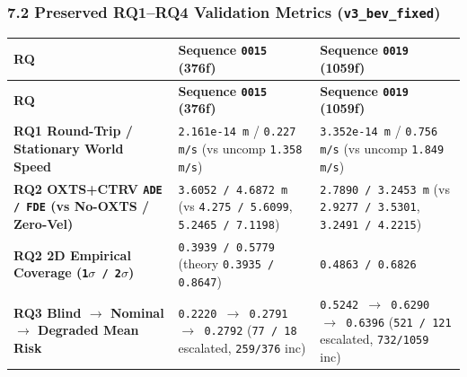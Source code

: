 \documentclass[10.5pt,a4paper]{article}
\begin{document}
\subsubsection{7.2 Preserved RQ1--RQ4 Validation Metrics (\texttt{v3\_\allowbreak{}bev\_\allowbreak{}fixed})}

\begin{footnotesize}
\setlength{\tabcolsep}{4pt}
\setlength{\LTleft}{0pt}\setlength{\LTright}{0pt}
\begin{longtable}{>{\raggedright\arraybackslash}p{} >{\raggedright\arraybackslash}p{} >{\raggedright\arraybackslash}p{}}
\toprule
\textbf{RQ} & \textbf{Sequence \texttt{0015} (376f)} & \textbf{Sequence \texttt{0019} (1059f)} \\
\midrule
\endfirsthead
\toprule
\textbf{RQ} & \textbf{Sequence \texttt{0015} (376f)} & \textbf{Sequence \texttt{0019} (1059f)} \\
\midrule
\endhead
\bottomrule
\endfoot
\textbf{RQ1 Round-Trip / Stationary World Speed} & \texttt{2.\allowbreak{}161e-\allowbreak{}14 m} / \texttt{0.\allowbreak{}227 m/\allowbreak{}s} (vs uncomp \texttt{1.\allowbreak{}358 m/\allowbreak{}s}) & \texttt{3.\allowbreak{}352e-\allowbreak{}14 m} / \texttt{0.\allowbreak{}756 m/\allowbreak{}s} (vs uncomp \texttt{1.\allowbreak{}849 m/\allowbreak{}s}) \\
\textbf{RQ2 OXTS+CTRV \texttt{ADE /\allowbreak{} FDE} (vs No-OXTS / Zero-Vel)} & \texttt{3.\allowbreak{}6052 /\allowbreak{} 4.\allowbreak{}6872 m} (vs \texttt{4.\allowbreak{}275 /\allowbreak{} 5.\allowbreak{}6099}, \texttt{5.\allowbreak{}2465 /\allowbreak{} 7.\allowbreak{}1198}) & \texttt{2.\allowbreak{}7890 /\allowbreak{} 3.\allowbreak{}2453 m} (vs \texttt{2.\allowbreak{}9277 /\allowbreak{} 3.\allowbreak{}5301}, \texttt{3.\allowbreak{}2491 /\allowbreak{} 4.\allowbreak{}2215}) \\
\textbf{RQ2 2D Empirical Coverage (\texttt{1$\sigma$ /\allowbreak{} 2$\sigma$})} & \texttt{0.\allowbreak{}3939 /\allowbreak{} 0.\allowbreak{}5779} (theory \texttt{0.\allowbreak{}3935 /\allowbreak{} 0.\allowbreak{}8647}) & \texttt{0.\allowbreak{}4863 /\allowbreak{} 0.\allowbreak{}6826} \\
\textbf{RQ3 Blind $\rightarrow$ Nominal $\rightarrow$ Degraded Mean Risk} & \texttt{0.\allowbreak{}2220 $\rightarrow$ 0.\allowbreak{}2791 $\rightarrow$ 0.\allowbreak{}2792} (\texttt{77 /\allowbreak{} 18} escalated, \texttt{259/\allowbreak{}376} inc) & \texttt{0.\allowbreak{}5242 $\rightarrow$ 0.\allowbreak{}6290 $\rightarrow$ 0.\allowbreak{}6396} (\texttt{521 /\allowbreak{} 121} escalated, \texttt{732/\allowbreak{}1059} inc) \\

\end{longtable}
\end{footnotesize}
\end{document}
